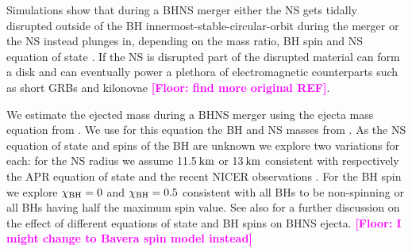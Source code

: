 \documentclass[twocolumn]{aastex63}
\newcommand{\floor}[1]{\textbf{\textcolor{magenta}{[Floor: #1]}}}
\newcommand\bhnsSingle{BHNS\xspace}
\newcommand{\km}{\ensuremath{\,\rm{km}}\xspace}
\newcommand{\Msun}{\ensuremath{\,\rm{M}_{\odot}}\xspace}
\newcommand{\mnsf}{\ensuremath{m_{\rm{NS}}}\xspace}
\newcommand{\mbhf}{\ensuremath{m_{\rm{BH}}}\xspace}
\newcommand{\qf}{\ensuremath{q_{\rm{f}}}\xspace}
\newcommand{\chibh}{\ensuremath{{\chi}_{\rm{BH}}}\xspace}
\begin{document}
Simulations show that during a \bhnsSingle merger either the \ac{NS} gets tidally disrupted outside of the \ac{BH} innermost-stable-circular-orbit during the merger or the \ac{NS} instead plunges in,  depending on the mass ratio, \ac{BH} spin and  \ac{NS} equation of state  \citep{2011ApJ...727...95P, 2012PhRvD..86l4007F,2018PhRvD..98h1501F}. If the \ac{NS} is disrupted part of the disrupted material can form a disk and can eventually power a plethora of electromagnetic counterparts such as short GRBs and kilonovae \floor{find more original REF}\citep{2019MNRAS.486.5289B, 2020EPJA...56....8B}. 

We estimate the ejected mass  during a \bhnsSingle merger  using the ejecta mass equation  from \citet[][Equation~4]{2018PhRvD..98h1501F}. We use for this equation the   \ac{BH} and \ac{NS} masses  from {}. As the \ac{NS} equation of state and spins of the \ac{BH} are unknown we explore two variations for each: for the \ac{NS} radius we assume 11.5\km or 13\km consistent with respectively the APR equation of state \citep{1998PhRvC..58.1804A} and the recent NICER observations \citep[e.g.][]{2019ApJ...887L..24M}. For the \ac{BH} spin we explore  $\chibh = 0$ and $\chibh = 0.5$ consistent with all \acp{BH} to be non-spinning or all \acp{BH} having half the maximum spin value. See also \citet{2019PhRvL.123d1102Z} for a further discussion on the effect of different equations of state and  \ac{BH} spins on \bhnsSingle ejecta.  \floor{I might change to Bavera spin model instead}

\end{document}
